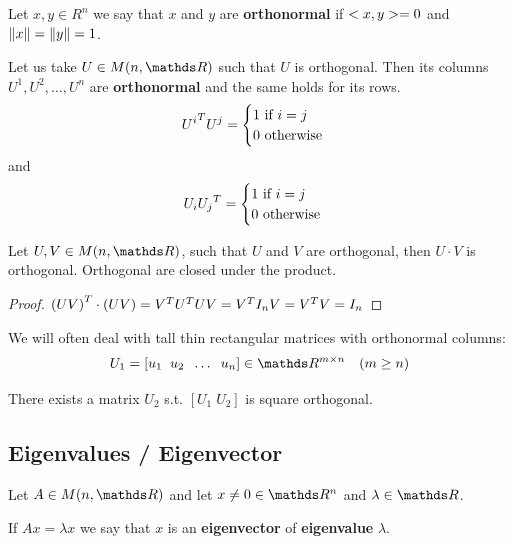 \documentclass[computationalMathematics.tex]{subfiles}
\begin{document}
\begin{definition}[Orthonormality]
  Let $x, y \in R^n$ we say that $x$ and $y$ are \textbf{orthonormal} if $<x, y> = 0$ and $\left\lVert x\right\rVert = \left\lVert y\right\rVert = 1$.
\end{definition}

\begin{proposition}
  Let us take $U \in M(n, \R)$ such that $U$ is orthogonal. Then its columns $U^1, U^2, \ldots, U^n$ are \textbf{orthonormal} and the same holds for its rows.
  \[
  {U^i}^{T} U^j = \begin{cases}
    1 \text{ if } i=j\\
    0 \text{ otherwise}
  \end{cases}
  \]
  and
  \[
    U_i {U_j}^{T} = \begin{cases}
    1 \text{ if } i=j\\
    0 \text{ otherwise}
  \end{cases}
  \]
\end{proposition}

\begin{proposition}
  Let $U, V \in M(n, \R)$, such that $U$ and $V$ are orthogonal, then $U \cdot V$ is orthogonal. Orthogonal are closed under the product.
\end{proposition}
\begin{proof}
  ${(UV)}^{T} \cdot (UV) = {V}^{T} {U}^{T} U V = {V}^{T} I_n V = {V}^{T} V = I_n$
\end{proof}


\begin{proposition}
We will often deal with tall thin rectangular matrices with
orthonormal columns:
  \[
    U_1 = [u_1 \; \; u_2 \; \; \dots \; \; u_n] \in \R^{m \times n} \quad (m \geq n)
  \]

There exists a matrix $U_2$ s.t. $[U_1 \; U_2]$ is square orthogonal.

  
\end{proposition}

\subsection{Eigenvalues / Eigenvector}

\begin{definition}
  Let $A \in M(n, \R)$ and let $x \neq 0 \in \R^n$ and $\lambda \in \R$.

  If $Ax = \lambda x$ we say that $x$ is an \textbf{eigenvector} of \textbf{eigenvalue} $\lambda$.
\end{definition}
\end{document}
